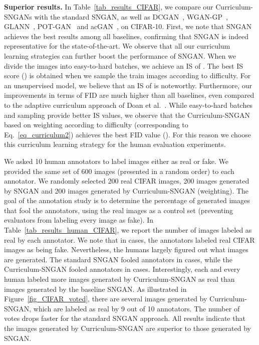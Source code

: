 \documentclass[10pt,twocolumn,letterpaper]{article}
\begin{document}
\noindent
{\bf Superior results.}
In Table~\ref{tab_results_CIFAR}, we compare our Curriculum-SNGANs with the standard SNGAN, as well as DCGAN~\cite{Radford-ICLR-2016}, WGAN-GP~\cite{Gulrajani-NIPS-2017}, GLANN~\cite{Hoshen-CVPR-2019}, POT-GAN~\cite{Avraham-CVPR-2019} and acGAN~\cite{Doan-AAAI-2019}, on CIFAR-10. First, we note that SNGAN achieves the best results among all baselines, confirming that SNGAN is indeed representative for the state-of-the-art. We observe that all our curriculum learning strategies can further boost the performance of SNGAN. When we divide the images into easy-to-hard batches, we achieve an IS of . The best IS score () is obtained when we sample the train images according to difficulty. For an unsupervised model, we believe that an IS of  is noteworthy. Furthermore, our improvements in terms of FID are much higher than all baselines, even compared to the adaptive curriculum approach of Doan et al.~\cite{Doan-AAAI-2019}. While easy-to-hard batches and sampling provide better IS values, we observe that the Curriculum-SNGAN based on weighting according to difficulty (corresponding to Eq.~\eqref{eq_curriculum2}) achieves the best FID value (). For this reason we choose this curriculum learning strategy for the human evaluation experiments.

We asked 10 human annotators to label images either as real or fake. We provided the same set of 600 images (presented in a random order) to each annotator. We randomly selected 200 real CIFAR images, 200 images generated by SNGAN and 200 images generated by Curriculum-SNGAN (weighting). The goal of the annotation study is to determine the percentage of generated images that fool the annotators, using the real images as a control set (preventing evaluators from labeling every image as fake). In Table~\ref{tab_results_human_CIFAR}, we report the number of images labeled as real by each annotator. We note that in  cases, the annotators labeled real CIFAR images as being fake. Nevertheless, the humans largely figured out what images are generated. The standard SNGAN fooled annotators in  cases, while the Curriculum-SNGAN fooled annotators in  cases. Interestingly, each and every human labeled more images generated by Curriculum-SNGAN as real than images generated by the baseline SNGAN. As illustrated in Figure~\ref{fig_CIFAR_voted}, there are several images generated by Curriculum-SNGAN, which are labeled as real by 9 out of 10 annotators. The number of votes drops faster for the standard SNGAN approach. All results indicate that the images generated by Curriculum-SNGAN are superior to those generated by SNGAN.
\end{document}
